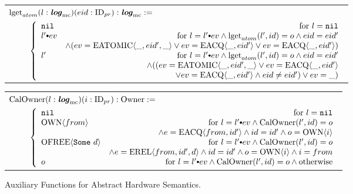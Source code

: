 \begin{figure}
\noindent{}
\begin{center}
\begin{tabular}{l}
$
   {\mathrm{lget}_{atom}}(l : {\mathrm{\textbf{\textit{log}}}_{\mathrm{mc}}}) (eid : {\mathrm{ID}_{pr}}) : {\mathrm{\textbf{\textit{log}}}_{\mathrm{mc}}} :=$\\
\ \ \ \ \ $    \left\{\begin{array}{lr}
        \nulllist & \text{for } l = \nulllist \\
       {\listconsoppo{ev}{l'}} & \text{for } l = \listconsoppo{ev}{l'} \wedge \loggetatom{l'}{id}{o}  \wedge eid = eid'\\
                    &   \wedge (ev = \atomicev{\_}{eid'}{\_} \vee ev = \acqev{\_}{eid'}   \vee ev = \acqev{\_}{eid'})  \\
      l' & \text{for } l = \listconsoppo{ev}{l'} \wedge \loggetatom{l'}{id}{o}  \wedge eid = eid'\\
                   & \wedge ((ev = \atomicev{\_ }{eid'}{\_} \vee ev = \acqev{\_}{eid'} \\
                   &  \vee ev = \acqev{\_}{eid'} \wedge eid \neq eid') \vee ev = \_) \\     
        \end{array} \right.
$\\
\end{tabular}
\end{center}



\noindent{}

\begin{center}
\begin{tabular}{l}
$
   {\mathrm{CalOwner}}(l : {\mathrm{\textbf{\textit{log}}}_{\mathrm{mc}}}) (i : {\mathrm{ID}_{pr}}) : {\mathrm{Owner}} :=$\\
\ \ \ \ \    $ \left\{\begin{array}{lr}
        \nulllist & \text{for } l = \nulllist \\
       \ownstate{from} & \text{for } l = \listconsoppo{ev}{l'} \wedge \calowner{l'}{id}{o} \\
                    &\wedge e = \acqev{from}{id'} \wedge id = id' \wedge o =  \ownstate{i}  \\
       \ofreestate{\optionsome \ d} & \text{for } l = \listconsoppo{ev}{l'} \wedge \calowner{l'}{id}{o} \\
                    &\wedge e = \relev{from}{id'}{d}  \wedge id = id' \wedge o = \ownstate{i} \wedge  i = from    \\
       o  & \text{for }  l = \listconsoppo{ev}{l'} \wedge \calowner{l'}{id}{o} \wedge \text{otherwise} \\
        \end{array} \right.
$ \\
\end{tabular}
\end{center}


\caption{Auxiliary Functions for Abstract Hardware Semantics.}
\label{fig:chapter:conlinkg:auxliary-funcitons-for-abstract-harware-semantics}
\end{figure}

